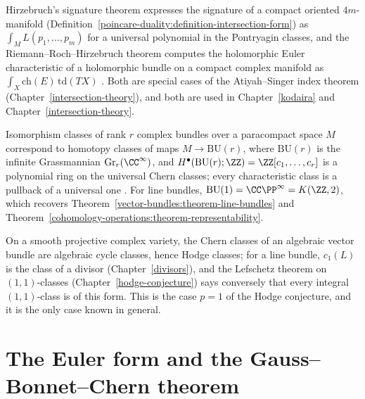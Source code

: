 \begin{remark}\label{characteristic-classes:remark-signature}
Hirzebruch's signature theorem expresses the signature of a compact oriented $4m$-manifold (Definition~\ref{poincare-duality:definition-intersection-form}) as $\int_ML(p_1, \ldots, p_m)$ for a universal
polynomial in the Pontryagin classes, and the Riemann--Roch--Hirzebruch theorem computes the holomorphic Euler characteristic of a holomorphic bundle on a compact complex manifold as
$\int_X\mathrm{ch}(E)\,\mathrm{td}(TX)$ \cite{hirzebruch-topological}. Both are special cases of the Atiyah--Singer index theorem (Chapter~\ref{intersection-theory}), and both are used in Chapter~\ref{kodaira} and
Chapter~\ref{intersection-theory}.
\end{remark}

\begin{remark}\label{characteristic-classes:remark-classifying-spaces}
Isomorphism classes of rank $r$ complex bundles over a paracompact space $M$ correspond to homotopy classes of maps $M \to \mathrm{BU}(r)$, where $\mathrm{BU}(r)$ is the infinite Grassmannian
$\mathrm{Gr}_r(\CC^\infty)$, and $H^\bullet(\mathrm{BU}(r); \ZZ) = \ZZ[c_1, \ldots, c_r]$ is a polynomial ring on the universal Chern classes; every characteristic class is a pullback of a universal one
\cite[Chapter 14]{milnor-stasheff}. For line bundles, $\mathrm{BU}(1) = \CC\PP^\infty = K(\ZZ, 2)$, which recovers Theorem~\ref{vector-bundles:theorem-line-bundles} and
Theorem~\ref{cohomology-operations:theorem-representability}.
\end{remark}

\begin{example}\label{characteristic-classes:example-algebraic-chern}
On a smooth projective complex variety, the Chern classes of an algebraic vector bundle are algebraic cycle classes, hence Hodge classes; for a line bundle, $c_1(L)$ is the class of a divisor
(Chapter~\ref{divisors}), and the Lefschetz theorem on $(1,1)$-classes (Chapter~\ref{hodge-conjecture}) says conversely that every integral $(1,1)$-class is of this form. This is the case $p = 1$ of the Hodge
conjecture, and it is the only case known in general.
\end{example}

\section{The Euler form and the Gauss--Bonnet--Chern theorem}\label{characteristic-classes:section-gauss-bonnet-chern}


